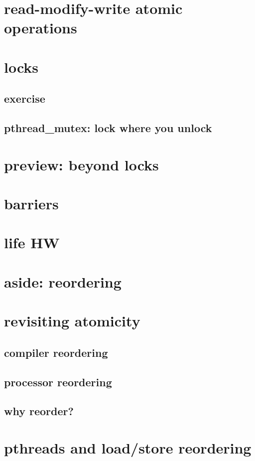 \section{read-modify-write atomic operations}


\section{locks}



\subsection{exercise}


\subsection{pthread\_mutex: lock where you unlock}


\section{preview: beyond locks}



\section{barriers}


\section{life HW}



\section{aside: reordering}

\section{revisiting atomicity}
\subsection{compiler reordering}


\subsection{processor reordering}


\subsection{why reorder?}





\section{pthreads and load/store reordering}


